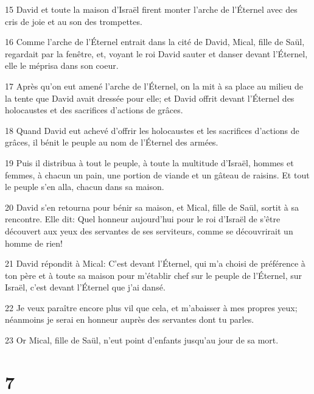 \par 15 David et toute la maison d'Israël firent monter l'arche de l'Éternel avec des cris de joie et au son des trompettes.
\par 16 Comme l'arche de l'Éternel entrait dans la cité de David, Mical, fille de Saül, regardait par la fenêtre, et, voyant le roi David sauter et danser devant l'Éternel, elle le méprisa dans son coeur.
\par 17 Après qu'on eut amené l'arche de l'Éternel, on la mit à sa place au milieu de la tente que David avait dressée pour elle; et David offrit devant l'Éternel des holocaustes et des sacrifices d'actions de grâces.
\par 18 Quand David eut achevé d'offrir les holocaustes et les sacrifices d'actions de grâces, il bénit le peuple au nom de l'Éternel des armées.
\par 19 Puis il distribua à tout le peuple, à toute la multitude d'Israël, hommes et femmes, à chacun un pain, une portion de viande et un gâteau de raisins. Et tout le peuple s'en alla, chacun dans sa maison.
\par 20 David s'en retourna pour bénir sa maison, et Mical, fille de Saül, sortit à sa rencontre. Elle dit: Quel honneur aujourd'hui pour le roi d'Israël de s'être découvert aux yeux des servantes de ses serviteurs, comme se découvrirait un homme de rien!
\par 21 David répondit à Mical: C'est devant l'Éternel, qui m'a choisi de préférence à ton père et à toute sa maison pour m'établir chef sur le peuple de l'Éternel, sur Israël, c'est devant l'Éternel que j'ai dansé.
\par 22 Je veux paraître encore plus vil que cela, et m'abaisser à mes propres yeux; néanmoins je serai en honneur auprès des servantes dont tu parles.
\par 23 Or Mical, fille de Saül, n'eut point d'enfants jusqu'au jour de sa mort.

\chapter{7}

